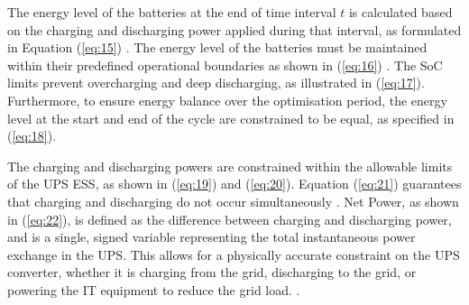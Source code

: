 \documentclass[lettersize,journal]{IEEEtran}
\begin{document}
The energy level of the batteries at the end of time interval \(t\) is calculated based on the charging and discharging power applied during that interval, as formulated in Equation (\ref{eq:15}) \cite{Takci2024Chapter}.
The energy level of the batteries must be maintained within their predefined operational boundaries as shown in (\ref{eq:16}) \cite{Takci2024Chapter}. The SoC limits prevent overcharging and deep discharging, as illustrated in (\ref{eq:17}). Furthermore, to ensure energy balance over the optimisation period, the energy level at the start and end of the cycle are constrained to be equal, as specified in (\ref{eq:18}).

The charging and discharging powers are constrained within the allowable limits of the UPS ESS, as shown in (\ref{eq:19}) and (\ref{eq:20}). Equation (\ref{eq:21}) guarantees that charging and discharging do not occur simultaneously \cite{Takci2024Chapter}. Net Power, as shown in (\ref{eq:22}), is defined as the difference between charging and discharging power, and is a single, signed variable representing the total instantaneous power exchange in the UPS. This allows for a physically accurate constraint on the UPS converter, whether it is charging from the grid, discharging to the grid, or powering the IT equipment to reduce the grid load. \cite{Hashmi2024ArXiv}.
\end{document}
